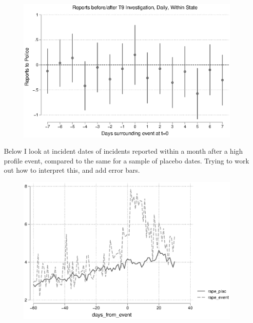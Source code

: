 \documentclass[AER,draftmode]{AEA}
\begin{document}
\begin{figure}
\includegraphics[width=\linewidth]{figures/police_state_cases.eps}
\end{figure}

\clearpage
Below I look at incident dates of incidents reported within a month after a high profile event, compared to the same for a sample of placebo dates. Trying to work out how to interpret this, and add error bars. 

\begin{figure}
\includegraphics[width=\linewidth]{figures/idt_analysis_2.eps}
\end{figure}
\end{document}
